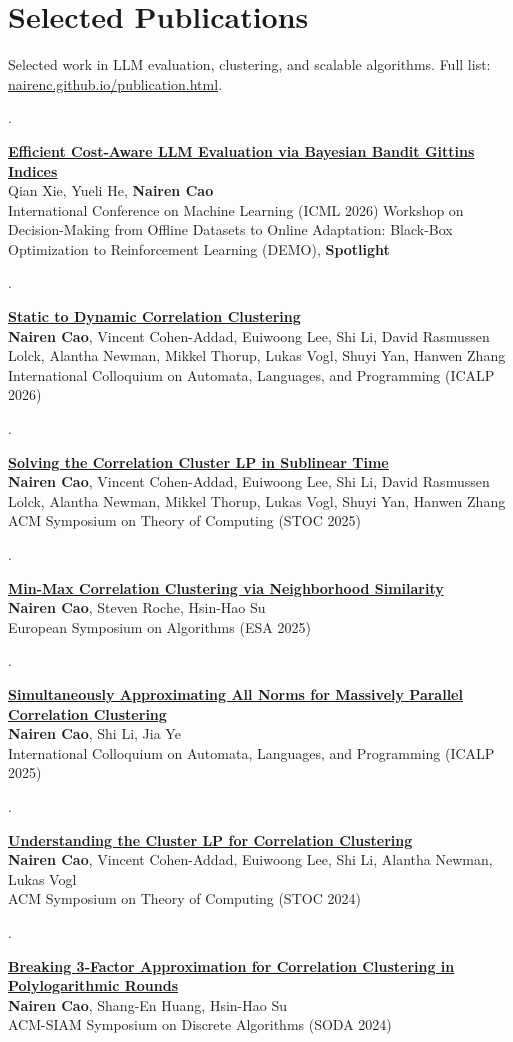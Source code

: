 \documentclass[10pt,a4paper]{article}
\newcounter{paper}
\newcommand{\publication}[3]{\stepcounter{paper}\begin{samepage}\noindent\begin{minipage}[t]{0.04\linewidth}\small\color{ink}\thepaper.\end{minipage}\begin{minipage}[t]{0.955\linewidth}\textbf{#1}\\#2\\{\fontsize{8.7}{10.3}\selectfont\color{ink}#3}\end{minipage}\par\vspace{5pt}\end{samepage}}
\begin{document}
\section{Selected Publications}
{\small Selected work in LLM evaluation, clustering, and scalable algorithms. Full list: \href{https://nairenc.github.io/publication.html}{nairenc.github.io/publication.html}.}\par
\vspace{4pt}
\fontsize{9.4}{11.2}\selectfont
\publication{\href{https://openreview.net/forum?id=GlVWFamE4j\&noteId=EPUyGqC3I7}{Efficient Cost-Aware LLM Evaluation via Bayesian Bandit Gittins Indices}}{Qian Xie, Yueli He, \textbf{Nairen Cao}}{International Conference on Machine Learning (ICML 2026) Workshop on Decision-Making from Offline Datasets to Online Adaptation: Black-Box Optimization to Reinforcement Learning (DEMO), \textbf{Spotlight}}
\publication{\href{https://doi.org/10.4230/LIPIcs.ICALP.2026.48}{Static to Dynamic Correlation Clustering}}{\textbf{Nairen Cao}, Vincent Cohen-Addad, Euiwoong Lee, Shi Li, David Rasmussen Lolck, Alantha Newman, Mikkel Thorup, Lukas Vogl, Shuyi Yan, Hanwen Zhang}{International Colloquium on Automata, Languages, and Programming (ICALP 2026)}
\publication{\href{https://arxiv.org/abs/2503.20883}{Solving the Correlation Cluster LP in Sublinear Time}}{\textbf{Nairen Cao}, Vincent Cohen-Addad, Euiwoong Lee, Shi Li, David Rasmussen Lolck, Alantha Newman, Mikkel Thorup, Lukas Vogl, Shuyi Yan, Hanwen Zhang}{ACM Symposium on Theory of Computing (STOC 2025)}
\publication{\href{https://drops.dagstuhl.de/entities/document/10.4230/LIPIcs.ESA.2025.41}{Min-Max Correlation Clustering via Neighborhood Similarity}}{\textbf{Nairen Cao}, Steven Roche, Hsin-Hao Su}{European Symposium on Algorithms (ESA 2025)}
\publication{\href{https://drops.dagstuhl.de/entities/document/10.4230/LIPIcs.ICALP.2025.40}{Simultaneously Approximating All Norms for Massively Parallel Correlation Clustering}}{\textbf{Nairen Cao}, Shi Li, Jia Ye}{International Colloquium on Automata, Languages, and Programming (ICALP 2025)}
\publication{\href{https://dl.acm.org/doi/abs/10.1145/3618260.3649749}{Understanding the Cluster LP for Correlation Clustering}}{\textbf{Nairen Cao}, Vincent Cohen-Addad, Euiwoong Lee, Shi Li, Alantha Newman, Lukas Vogl}{ACM Symposium on Theory of Computing (STOC 2024)}
\publication{\href{https://epubs.siam.org/doi/10.1137/1.9781611977912.143}{Breaking 3-Factor Approximation for Correlation Clustering in Polylogarithmic Rounds}}{\textbf{Nairen Cao}, Shang-En Huang, Hsin-Hao Su}{ACM-SIAM Symposium on Discrete Algorithms (SODA 2024)}
\end{document}
